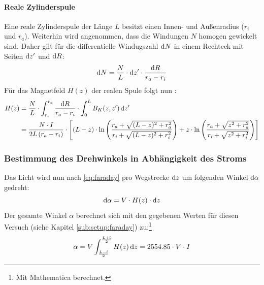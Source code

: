 \paragraph{Reale Zylinderspule}
Eine reale Zylinderspule der Länge $L$ besitzt einen Innen- und Außenradius ($r_i$ und $r_a$). 
Weiterhin wird angenommen, dass die Windungen $N$ homogen gewickelt sind. Daher gilt für die differentielle Windugszahl $\mathrm{d} N$ in einem 
Rechteck mit Seiten $\mathrm{d} z'$ und $\mathrm{d} R$:
\begin{equation}
  \mathrm{d} N = \frac{N}{L} \cdot \mathrm{d} z' \cdot \frac{\mathrm{d} R}{r_a - r_i}
\end{equation}
Für das Magnetfeld $H(z)$ der realen Spule folgt nun \cite{herrmann}:
\begin{equation}
  \label{eq:hreal}
  \begin{split}
    H(z) &= \frac{N}{L} \cdot \int_{r_i}^{r_a} \frac{\mathrm{d} R}{r_a - r_i} \cdot \int_{0}^{L} B_K(z, z')\, \mathrm{d} z'\\
    &=\frac{N \cdot I}{2 L \left( r_a - r_i \right) } \cdot \left[ 
  	      (L-z) \cdot \ln \left( \frac{r_a + \sqrt{(L-z)^2  +r_a^2}}{r_i + \sqrt{(L-z)^2 + r_i^2}} \right) + 
  		  z \cdot \ln \left( \frac{r_a + \sqrt{z^2  +r_a^2}}{r_i + \sqrt{z^2 + r_i^2}} \right)  \right]
  \end{split}
\end{equation}
\subsubsection{Bestimmung des Drehwinkels in Abhängigkeit des Stroms}
\label{subsub:alpha}
Das Licht wird nun nach \autoref{eq:faraday} pro Wegstrecke $\mathrm{d} z$ um folgenden Winkel $\mathrm{d} \alpha$ gedreht:
\begin{equation}
  \mathrm{d} \alpha = V \cdot H(z) \cdot \mathrm{d} z
\end{equation}
Der gesamte Winkel $\alpha$ berechnet sich mit den gegebenen Werten für diesen Versuch (siehe Kapitel \ref{sub:setup:faraday}) 
zu:\footnote{Mit Mathematica berechnet.}
\begin{equation}
  \label{eq:verdet}
  \alpha = V \int_{\frac{L-l}{2}}^{\frac{L+l}{2}} H(z)\, \mathrm{d} z = 2554.85 \cdot V \cdot I 
\end{equation}